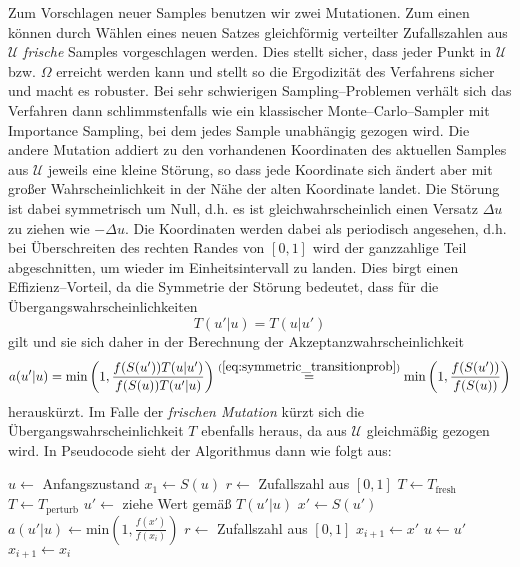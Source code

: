 	Zum Vorschlagen neuer Samples benutzen wir zwei Mutationen. Zum einen können durch Wählen eines neuen Satzes gleichförmig verteilter Zufallszahlen aus $\mathcal{U}$ {\em frische} Samples vorgeschlagen werden. Dies stellt sicher, dass jeder Punkt in $\mathcal{U}$ bzw. $\Omega$ erreicht werden kann und stellt so die Ergodizität des Verfahrens sicher und macht es robuster. Bei sehr schwierigen Sampling--Problemen verhält sich das Verfahren dann schlimmstenfalls wie ein klassischer Monte--Carlo--Sampler mit Importance Sampling, bei dem jedes Sample unabhängig gezogen wird.
	Die andere Mutation addiert zu den vorhandenen Koordinaten des aktuellen Samples aus $\mathcal{U}$ jeweils eine kleine Störung, so dass jede Koordinate sich ändert aber mit großer Wahrscheinlichkeit in der Nähe der alten Koordinate landet. Die Störung ist dabei symmetrisch um Null, d.h. es ist gleichwahrscheinlich einen Versatz $\Delta u$ zu ziehen wie $-\Delta u$. Die Koordinaten werden dabei als periodisch angesehen, d.h. bei Überschreiten des rechten Randes von $[0,1]$ wird der ganzzahlige Teil abgeschnitten, um wieder im Einheitsintervall zu landen. Dies birgt einen Effizienz--Vorteil, da die Symmetrie der Störung bedeutet, dass für die Übergangswahrscheinlichkeiten
	\begin{equation}
	  T(u'|u)=T(u|u')
	  \label{eq:symmetric_transitionprob}
	\end{equation}
	gilt und sie sich daher in der Berechnung der Akzeptanzwahrscheinlichkeit
	$$a(u'|u)=\text{min}\left(1,\frac{f(S(u'))T(u|u')}{f(S(u))T(u'|u)}\right)\stackrel{(\ref{eq:symmetric_transitionprob})}{=}\text{min}\left(1,\frac{f(S(u'))}{f(S(u))}\right)$$
	herauskürzt. Im Falle der {\em frischen Mutation} kürzt sich die Übergangswahrscheinlichkeit $T$ ebenfalls heraus, da aus $\mathcal{U}$ gleichmäßig gezogen wird.
	In Pseudocode sieht der Algorithmus dann wie folgt aus:
	\begin{algorithmic}
		\STATE $u \leftarrow$ Anfangszustand
		\STATE $x_1 \leftarrow S(u)$
			\STATE $r\leftarrow$ Zufallszahl aus $[0,1]$
						\STATE $T \leftarrow T_\text{fresh}$
				\STATE $T \leftarrow T_\text{perturb}$
			\ENDIF
			\STATE $u'\leftarrow$ ziehe Wert gemäß $T(u'|u)$
			\STATE $x' \leftarrow S(u')$
			\STATE $a(u'|u) \leftarrow \text{min}\left(1,\frac{f(x')}{f(x_i)}\right)$
			\STATE $r\leftarrow$ Zufallszahl aus $[0,1]$
			  \STATE $x_{i+1} \leftarrow x'$
			  \STATE $u \leftarrow u'$
			\ELSE	\STATE $x_{i+1} \leftarrow x_i$
			\ENDIF
	  \ENDFOR
	\end{algorithmic}


